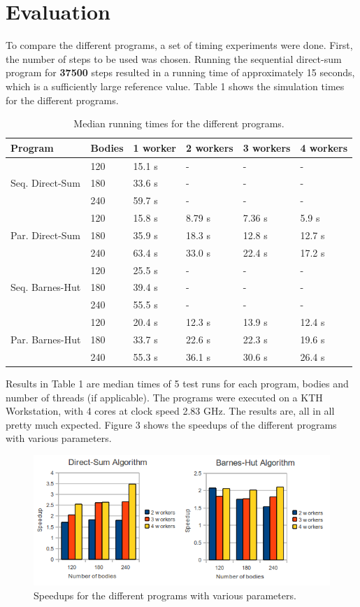 \documentclass[10pt,a4paper]{article}
\begin{document}
\section{Evaluation}
To compare the different programs, a set of timing experiments were done. First, the number of steps to be used was chosen. Running the sequential direct-sum program for \textbf{37500} steps resulted in a running time of approximately 15 seconds, which is a sufficiently large reference value. Table 1 shows the simulation times for the different programs.
\begin{table}[h!]
\centering
\begin{tabular}{|l|l|l|l|l|l|}
\hline
Program & Bodies & 1 worker & 2 workers & 3 workers & 4 workers\\ \hline
\multirow{3}{*}{Seq. Direct-Sum} & 120 &  15.1 s & - & - & -\\
 & 180 & 33.6 s & - & - & - \\
 & 240 & 59.7 s & - & - & - \\ \hline
 \multirow{3}{*}{Par. Direct-Sum} & 120 &  15.8 s &  8.79 s &  7.36 s & 5.9 s\\
 & 180 & 35.9 s & 18.3 s & 12.8 s & 12.7 s\\
 & 240 & 63.4 s & 33.0 s & 22.4 s & 17.2 s\\ \hline
 \multirow{3}{*}{Seq. Barnes-Hut} & 120 & 25.5 s & - & - & -\\
 & 180 & 39.4 s & - & - & -\\
 & 240 & 55.5 s & - & - & -\\ \hline
 \multirow{3}{*}{Par. Barnes-Hut} & 120 & 20.4 s & 12.3 s & 13.9 s & 12.4 s\\
 & 180 & 33.7 s & 22.6 s & 22.3 s & 19.6 s\\
 & 240 & 55.3 s & 36.1 s & 30.6 s & 26.4 s\\ \hline
\end{tabular}
\caption{Median running times for the different programs.}
\end{table}
Results in Table 1 are median times of 5 test runs for each program, bodies and number of threads (if applicable). The programs were executed on a KTH Workstation, with 4 cores at clock speed 2.83 GHz. The results are, all in all pretty much expected. Figure 3 shows the speedups of the different programs with various parameters.

\begin{figure}[h!]
\centering \includegraphics[scale=0.75]{images/speedup-graphs}
\caption{Speedups for the different programs with various parameters.}
\end{figure}
\end{document}
